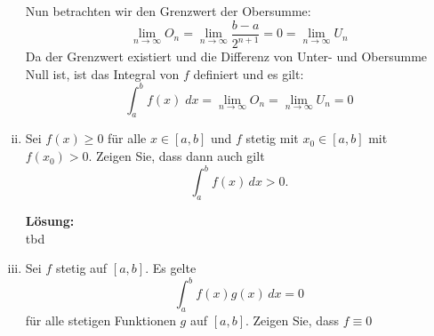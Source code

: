 \documentclass[11pt,a4paper,ngerman]{article}
\begin{document}
\begin{enumerate}[i)]
Nun betrachten wir den Grenzwert der Obersumme:
$$
\lim_{n \to \infty}{O_n} = \lim_{n \to \infty}{\frac{b-a}{2^{n+1}}} = 0 = \lim_{n \to \infty}{U_n}
$$
Da der Grenzwert existiert und die Differenz von Unter- und Obersumme Null ist, ist das Integral von $f$ definiert und es gilt:
$$ \int_{a}^{b}{f(x) \; dx} = \lim_{n \to \infty}{O_n} = \lim_{n \to \infty}{U_n} = 0 $$


    \item Sei $f(x) \geq 0$ für alle $x \in [a,b]$ und $f$ stetig mit $x_0 \in [a,b]$ mit $f(x_0) > 0$. Zeigen Sie, dass dann auch gilt
$$
    \int_{a}^{b} f(x) \, dx > 0.
$$

\textbf{Lösung:}\\

tbd

    \item Sei $f$ stetig auf $[a,b]$. Es gelte
$$
\int_{a}^{b} f(x)g(x) \, dx = 0
$$
für alle stetigen Funktionen $g$ auf $[a,b]$. Zeigen Sie, dass $f\equiv 0$
\end{enumerate}
\label{LastPage}
\end{document}
